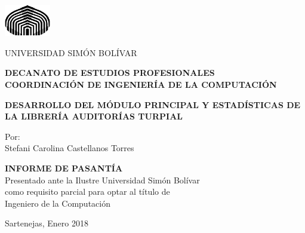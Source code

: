 \thispagestyle{empty}
\begin{center}
    \begin{singlespace}
        \includegraphics[width=2cm]{logo_USB}
        
        {\large
          UNIVERSIDAD SIMÓN BOLÍVAR\\
        }
        
        \textbf{
          DECANATO DE ESTUDIOS PROFESIONALES\\
          COORDINACIÓN DE INGENIERÍA DE LA COMPUTACIÓN
        }
        
        \vspace{4cm}%
        \textbf{
          DESARROLLO DEL MÓDULO PRINCIPAL Y ESTADÍSTICAS DE LA LIBRERÍA AUDITORÍAS TURPIAL
        }
        \vspace{4cm}
        
        Por:\\
        Stefani Carolina Castellanos Torres
        
        \vspace{5cm}
          \textbf{INFORME DE PASANTÍA}\\
          Presentado ante la Ilustre Universidad Simón Bolívar\\
          como requisito parcial para optar al título de\\
          Ingeniero de la Computación\\
        \selectfont
        
        \vspace{3cm}
        Sartenejas, Enero 2018
    
    \end{singlespace}
\end{center}

\clearpage


